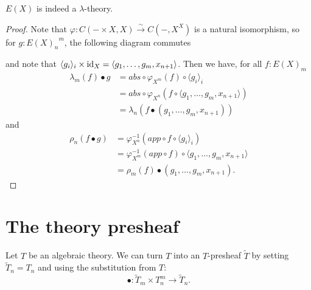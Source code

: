 \begin{lemma}
  $ E(X) $ is indeed a $ \lambda $-theory.
\end{lemma}
\begin{proof}
  Note that $ \varphi: C(- \times X, X) \xrightarrow{\sim} C(-, X^X) $ is a natural isomorphism, so for $ g: {E(X)_n}^m $, the following diagram commutes
  \begin{center}
  \end{center}
  and note that $ \langle g_i \rangle_i \times \text{id}_{X} = \langle g_1, \dots, g_m, x_{n + 1} \rangle $. Then we have, for all $ f: E(X)_m $
  \begin{align*}
    \lambda_m(f) \bullet g &= abs \circ \varphi_{X^m}(f) \circ \langle g_i \rangle_i\\
    &= abs \circ \varphi_{X^n}(f \circ \langle g_1, \dots, g_m, x_{n + 1} \rangle)\\
    &= \lambda_n(f \bullet (g_1, \dots, g_m, x_{n + 1}))
  \end{align*}
  and
  \begin{align*}
    \rho_n(f \bullet g) &= \varphi_{X^n}^{-1}(app \circ f \circ \langle g_i \rangle_i)\\
    &= \varphi_{X^m}^{-1}(app \circ f) \circ \langle g_1, \dots, g_m, x_{n + 1} \rangle\\
    &= \rho_m(f) \bullet (g_1, \dots, g_m, x_{n + 1}).
  \end{align*}
\end{proof}

\section{The theory presheaf}

\begin{definition}
  Let $ T $ be an algebraic theory. We can turn $ T $ into an $ T $-presheaf $ \tilde T $ by setting $ \tilde T_n = T_n $ and using the substitution from $ T $:
  \[ \bullet: \tilde T_m \times T_n^m \to \tilde T_n. \]
\end{definition}

